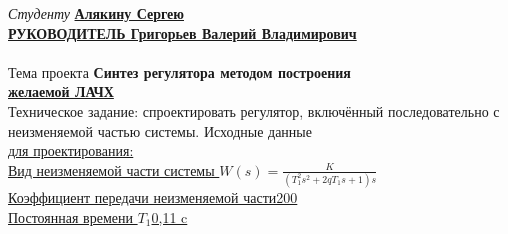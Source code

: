 \documentclass[fleqn, a4paper, 12pt, russian]{article}
\begin{document}
	\flushleft
	{\fontsize{14pt}{0cm}\selectfont \textit{Студенту} \bfseries\hspace{1cm}\underline{\hspace{0.25cm}Алякину Сергею\hspace{9.20cm}}} \\ \vspace{0.5cm}
	{\fontsize{14pt}{0cm}\selectfont \bfseries \underline{РУКОВОДИТЕЛЬ \hspace{3.17cm} Григорьев Валерий Владимирович\hspace{1cm}}}\\ \vspace{0.3cm}
	\underline{\hspace{\textwidth}} \\ \vspace{0.3cm}
	{\fontsize{14pt}{0cm}\hspace{0.5cm}Тема проекта \hspace{1cm}\bfseries Синтез регулятора методом построения\\ \underline{\hspace{4.8cm}желаемой ЛАЧХ\hspace{8.25cm}}} \\ \vspace{0.3cm}
	{\fontsize{14pt}{0cm}\hspace{0.5cm}Техническое задание: спроектировать регулятор, включённый последовательно с неизменяемой частью системы. Исходные данные\\ \underline{для проектирования:\hspace{12.4cm}}} \\ \vspace{0.2cm}
	{\fontsize{14pt}{0cm}\selectfont \underline{Вид неизменяемой части системы \hspace{3cm}$W(s) = \displaystyle{\frac{K}{(T_1^2s^2 + 2qT_1s + 1)s}}$\hspace{0.2cm}}} \\ \vspace{0.2cm}
	{\fontsize{14pt}{0cm}\selectfont \underline{Коэффициент передачи неизменяемой части\hspace{5.8cm}200\hspace{0.7cm}}} \\ \vspace{0.2cm}
	{\fontsize{14pt}{0cm}\selectfont \underline{Постоянная времени $T_1$\hspace{10.1cm}0,11 c\hspace{0.4cm}}} \\ \vspace{0.2cm}
\end{document}
